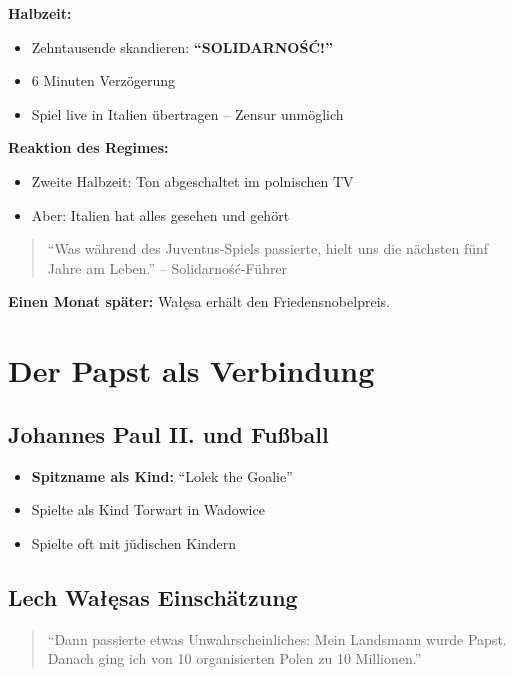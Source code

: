 \documentclass[11pt,a4paper]{book}
\begin{document}
\textbf{Halbzeit:}
\begin{itemize}
    \item Zehntausende skandieren: \textbf{``SOLIDARNOŚĆ!''}
    \item 6 Minuten Verzögerung
    \item Spiel live in Italien übertragen -- Zensur unmöglich
\end{itemize}

\textbf{Reaktion des Regimes:}
\begin{itemize}
    \item Zweite Halbzeit: Ton abgeschaltet im polnischen TV
    \item Aber: Italien hat alles gesehen und gehört
\end{itemize}

\begin{quote}
``Was während des Juventus-Spiels passierte, hielt uns die nächsten fünf Jahre am Leben.'' -- Solidarność-Führer
\end{quote}

\textbf{Einen Monat später:} Wałęsa erhält den Friedensnobelpreis.

\section{Der Papst als Verbindung}

\subsection{Johannes Paul II. und Fußball}

\begin{itemize}
    \item \textbf{Spitzname als Kind:} ``Lolek the Goalie''
    \item Spielte als Kind Torwart in Wadowice
    \item Spielte oft mit jüdischen Kindern
\end{itemize}

\subsection{Lech Wałęsas Einschätzung}

\begin{quote}
``Dann passierte etwas Unwahrscheinliches: Mein Landsmann wurde Papst. Danach ging ich von 10 organisierten Polen zu 10 Millionen.''
\end{quote}
\end{document}
